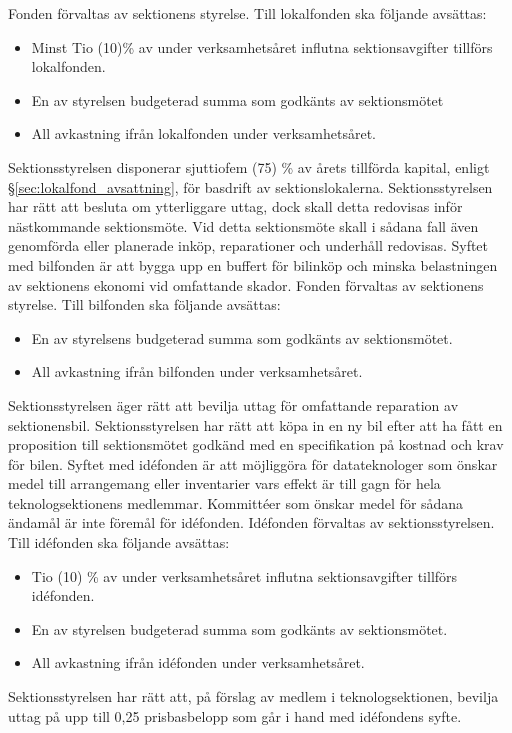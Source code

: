 \documentclass[a4paper]{dtek}
\begin{document}
\para Fonden förvaltas av sektionens styrelse.
\para Till lokalfonden ska följande avsättas:
\begin{itemize}
\item Minst Tio (10)\% av under verksamhetsåret influtna sektionsavgifter tillförs lokalfonden.
\item En av styrelsen budgeterad summa som godkänts av sektionsmötet
\item All avkastning ifrån lokalfonden under verksamhetsåret.
\end{itemize}
\para Sektionsstyrelsen disponerar sjuttiofem (75) \% av årets tillförda kapital, enligt \S\ref{sec:lokalfond_avsattning}, för basdrift av sektionslokalerna.
\para Sektionsstyrelsen har rätt att besluta om ytterliggare uttag, dock skall detta redovisas inför nästkommande sektionsmöte. Vid detta sektionsmöte skall i sådana fall även genomförda eller planerade inköp, reparationer och underhåll redovisas.
\para[Bilfonden] Syftet med bilfonden är att bygga upp en buffert för bilinköp och minska belastningen av sektionens ekonomi vid omfattande skador.
\para Fonden förvaltas av sektionens styrelse.
\para Till bilfonden ska följande avsättas:
\begin{itemize}
\item En av styrelsens budgeterad summa som godkänts av sektionsmötet.
\item All avkastning ifrån bilfonden under verksamhetsåret.
\end{itemize}
\para Sektionsstyrelsen äger rätt att bevilja uttag för omfattande reparation av sektionensbil.
\para Sektionsstyrelsen har rätt att köpa in en ny bil efter att ha fått en proposition till sektionsmötet godkänd med en specifikation på kostnad och krav för bilen.
\para[Idéfonden] Syftet med idéfonden är att möjliggöra för datateknologer som önskar medel till arrangemang eller inventarier vars effekt är till gagn för hela teknologsektionens medlemmar. Kommittéer som önskar medel för sådana ändamål är inte föremål för idéfonden.
\para Idéfonden förvaltas av sektionsstyrelsen.
\para Till idéfonden ska följande avsättas:
\begin{itemize}
\item Tio (10) \% av under verksamhetsåret influtna sektionsavgifter tillförs idéfonden.
\item En av styrelsen budgeterad summa som godkänts av sektionsmötet.
\item All avkastning ifrån idéfonden under verksamhetsåret.
\end{itemize}
\para Sektionsstyrelsen har rätt att, på förslag av medlem i teknologsektionen, bevilja uttag på upp till 0,25 prisbasbelopp som går i hand med idéfondens syfte.
\end{document}
